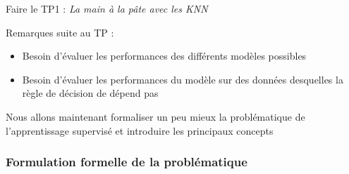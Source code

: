 \documentclass[10pt]{beamer}
\begin{document}
\begin{frame}
	\begin{center}
		Faire le TP1 : \textit{La main à la pâte avec les KNN}
	\end{center}
	
	\vspace*{3em}
	\pause
	Remarques suite au TP :\\[1.5em]
	\begin{itemize}
		\item Besoin d'évaluer les performances des différents modèles possibles\\[1em]
		\item Besoin d'évaluer les performances du modèle sur des données desquelles la règle de décision de dépend pas
	\end{itemize}
	
		\vspace*{3em}
		
		\pause
		\begin{vblock}{}\centering
				Nous allons maintenant formaliser un peu mieux la problématique de l'apprentissage supervisé et introduire les principaux concepts
			\end{vblock}
\end{frame}

\subsubsection{ Formulation formelle de la problématique }

\end{document}
